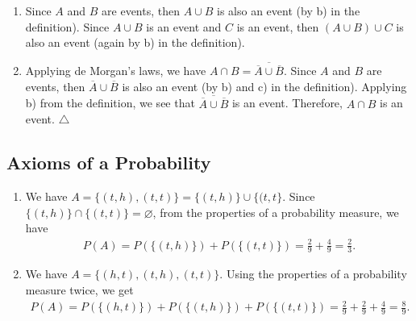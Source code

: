 	\begin{problem}
	\begin{enumerate}[label=\alph*)]
	\item Since $A$ and $B$ are events, then $A \cup B$ is also an event (by b) in the definition). Since $A \cup B$ is an event and $C$ is an event, then $(A \cup B) \cup C$ is also an event (again by b) in the definition). 
	\item Applying de Morgan's laws, we have $A \cap B = \overline{\overline{A} \cup \overline{B}}$. Since $A$ and $B$ are events, then $\overline{A} \cup \overline{B}$ is also an event (by b) and c) in the definition). Applying b) from the definition, we see that $\overline{ \overline{A} \cup \overline{B}}$ is an event. Therefore, $A \cap B$ is an event. \hfill $\triangle$
	\end{enumerate}
	\end{problem}
	
	\subsection{Axioms of a Probability}
	\begin{problem}
	\begin{enumerate}[label=\alph*)]
	\item We have $A = \{ (t, h) , (t, t) \} = \{ (t, h) \} \cup \{ (t, t \}$. Since $\{ (t, h) \} \cap \{ (t, t) \} = \varnothing$, from the properties of a probability measure, we have
		\begin{align*}
		P (A) = P (\{ (t, h) \}) + P (\{ (t, t) \}) = \frac{2}{9} + \frac{4}{9} = \frac{2}{3} .
		\end{align*}
	\item We have $A = \{ (h, t) , (t, h) , (t, t) \}$. Using the properties of a probability measure twice, we get
		\begin{align*}
		P (A) = P (\{ (h, t) \}) + P (\{ (t, h) \}) + P (\{ (t, t) \}) = \frac{2}{9} + \frac{2}{9} + \frac{4}{9} = \frac{8}{9} . \tag*{$\triangle$}
		\end{align*}
	\end{enumerate}
	\end{problem}
	
